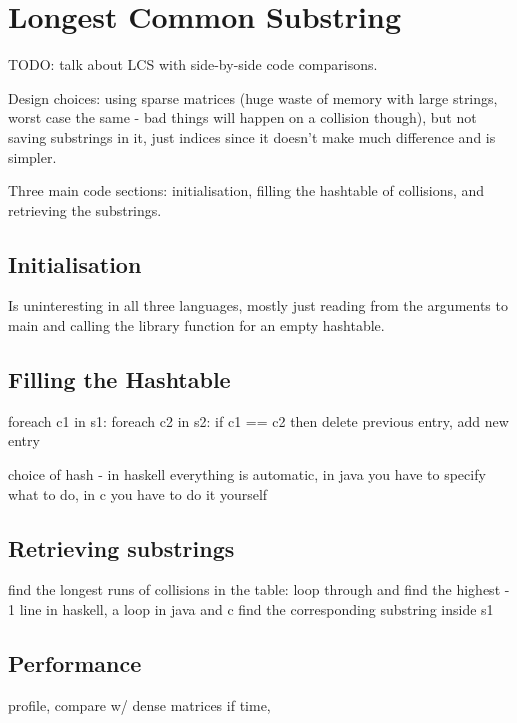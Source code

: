 \section{Longest Common Substring}
TODO: talk about LCS with side-by-side code comparisons.

Design choices: using sparse matrices (huge waste of memory with large strings, worst case the same - bad things will happen on a collision though), but not saving substrings in it, just indices since it doesn't make much difference and is simpler.

Three main code sections: initialisation, filling the hashtable of collisions, and retrieving the substrings.

\subsection{Initialisation}
Is uninteresting in all three languages, mostly just reading from the arguments to main and calling the library function for an empty hashtable.

\subsection{Filling the Hashtable}
foreach c1 in s1:
	foreach c2 in s2:
		if c1 == c2 then delete previous entry, add new entry
		
choice of hash - in haskell everything is automatic, in java you have to specify what to do, in c you have to do it yourself

\subsection{Retrieving substrings}
find the longest runs of collisions in the table: loop through and find the highest - 1 line in haskell, a loop in java and c
find the corresponding substring inside s1

\subsection{Performance}
profile, compare w/ dense matrices if time, 
